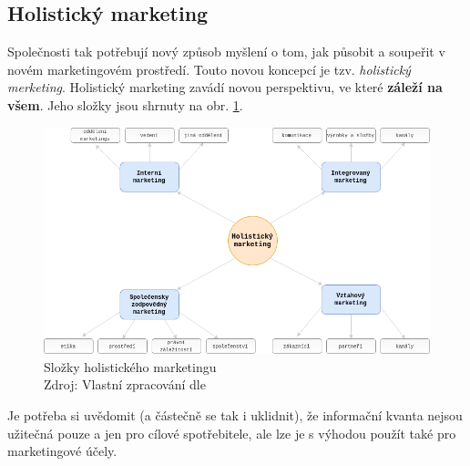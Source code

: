 \subsection{Holistický marketing}

Společnosti tak potřebují nový způsob myšlení o tom, jak působit a soupeřit v novém marketingovém prostředí. Touto novou koncepcí je tzv. \textit{holistický merketing}.
\cite{kotler2007marketingmanagement} Holistický marketing zavádí novou perspektivu, ve které \textbf{záleží na všem}. Jeho složky jsou shrnuty na obr. \ref{fig:slozky-holistickeho-marketingu}.

\begin{figure}[htbp!]
    \centering
    \includegraphics[width=.88\textwidth]{assets/slozky-holistickeho-marketingu.png}
    \caption{Složky holistického marketingu \\ Zdroj: Vlastní zpracování dle \textcite[s. 56]{kotler2007marketingmanagement}}
    \label{fig:slozky-holistickeho-marketingu}
\end{figure}

Je potřeba si uvědomit (a částečně se tak i uklidnit), že informační kvanta nejsou užitečná pouze a jen pro cílové spotřebitele, ale lze je s výhodou použít také pro marketingové účely.